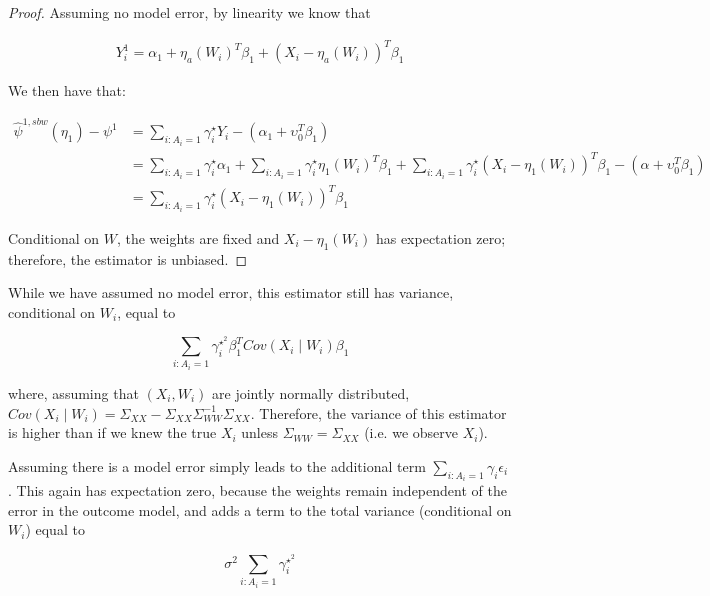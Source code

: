 \begin{proof}

Assuming no model error, by linearity we know that

\begin{align*}
Y_i^1 = \alpha_1 + \eta_a(W_i)^T\beta_1 + (X_i - \eta_a(W_i))^T\beta_1
\end{align*}

We then have that:

\begin{align*}
    \hat{\psi}^{1, sbw}(\eta_1) - \psi^1 &= \sum_{i: A_i = 1}\gamma_i^\star Y_i - (\alpha_1 + \upsilon_0^T\beta_1) \\
    &= \sum_{i: A_i = 1}\gamma_i^\star\alpha_1 + \sum_{i: A_i = 1}\gamma_i^\star\eta_1(W_i)^T\beta_1 + \sum_{i: A_i = 1}\gamma_i^\star(X_i - \eta_1(W_i))^T\beta_1 - (\alpha + \upsilon_0^T\beta_1) \\
    &= \sum_{i: A_i = 1}\gamma_i^\star(X_i - \eta_1(W_i))^T\beta_1
\end{align*}

Conditional on $W$, the weights are fixed and $X_i - \eta_1(W_i)$ has expectation zero; therefore, the estimator is unbiased.

\end{proof}
\begin{remark}

While we have assumed no model error, this estimator still has variance, conditional on $W_i$, equal to

$$
\sum_{i: A_i = 1} \gamma_i^{\star^2}\beta_1^T Cov(X_i \mid W_i)\beta_1
$$

where, assuming that $(X_i, W_i)$ are jointly normally distributed, $Cov(X_i \mid W_i) = \Sigma_{XX} - \Sigma_{XX}\Sigma_{WW}^{-1}\Sigma_{XX}$. Therefore, the variance of this estimator is higher than if we knew the true $X_i$ unless $\Sigma_{WW} = \Sigma_{XX}$ (i.e. we observe $X_i$). 

\end{remark}

\begin{remark}
Assuming there is a model error simply leads to the additional term $\sum_{i: A_i = 1}\gamma_i\epsilon_i$. This again has expectation zero, because the weights remain independent of the error in the outcome model, and adds a term to the total variance (conditional on $W_i$) equal to

$$
\sigma^2\sum_{i: A_i = 1}\gamma_i^{\star^2}
$$
\end{remark}

